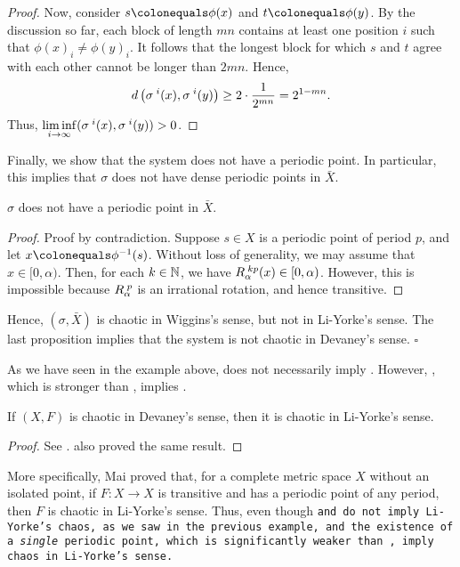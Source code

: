 \documentclass[10pt,twoside,draft]{book}
\begin{document}
\begin{example}
\begin{proposition}
\begin{proof}
  Now, consider $s \ceq \phi(x)$ and $t \ceq \phi(y)$.
  By the discussion so far, each block of length $mn$ contains at least one position $i$ such that $\phi(x)_{i} \neq \phi(y)_{i}$.
  It follows that the longest block for which $s$ and $t$ agree with each other cannot be longer than $2mn$.
  Hence,
  \begin{equation*}
    d\left( \sigma^{\;i}(x), \sigma^{\;i}(y) \right) 
    \geq 2 \cdot \frac{1}{2^{mn}}
    = 2^{1 - mn}.
  \end{equation*}
  Thus, $\liminf\limits_{i \to \infty} (\sigma^{\;i}(x), \sigma^{\;i}(y)) > 0$.
\end{proof}
  \end{proposition}
  Finally, we show that the system does not have a periodic point.
  In particular, this implies that $\sigma$ does not have dense periodic points in $\bar{X}$.
  \begin{proposition}
    $\sigma$ does not have a periodic point in $\bar{X}$.
    \begin{proof}
      Proof by contradiction.
      Suppose $s \in X$ is a periodic point of period $p$, and let $x \ceq \phi^{-1}(s)$. 
      Without loss of generality, we may assume that $x \in [0, \alpha)$. %
      Then, for each $k \in \mathbb{N}$, we have $R_\alpha^{\;kp}(x) \in [0, \alpha)$. %
      However, this is impossible because $R_\alpha^{\;p}$ is an irrational rotation, and hence transitive.
    \end{proof}
  \end{proposition}
  Hence, $(\sigma, \bar{X})$ is chaotic in Wiggins's sense, but not in Li-Yorke's sense.
  The last proposition implies that the system is not chaotic in Devaney's sense.
  $\square$
\end{example}
As we have seen in the example above, \wig does not necessarily imply \liy.
However, \dev, which is stronger than \wig, implies \liy.
\begin{theorem}
  If $(X, F)$ is chaotic in Devaney's sense, then it is chaotic in Li-Yorke's sense.
  \begin{proof}
    See \citet{mai}.
    \citet{huang} also proved the same result.
  \end{proof}
  \label{thm:dev-liy}
\end{theorem}
More specifically, Mai proved that, for a complete metric space $X$ without an isolated point, if $F: X \to X$ is transitive and has a periodic point of any period, then $F$ is chaotic in Li-Yorke's sense.
Thus, even though \tt and \sdic do not imply Li-Yorke's chaos, as we saw in the previous example, \tt and the existence of a \textit{single} periodic point, which is significantly weaker than \dpp, imply chaos in Li-Yorke's sense.
\end{document}
